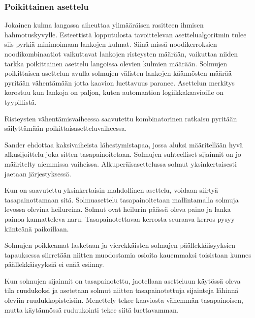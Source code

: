 \documentclass[finnish,12pt]{article}
\begin{document}
		\subsubsection{Poikittainen asettelu}

Jokainen kulma langassa aiheuttaa ylimääräisen rasitteen ihmisen hahmotuskyvylle. \cite{RefWorks:47}
Esteettistä lopputulosta tavoittelevan asettelualgoritmin tulee siis pyrkiä minimoimaan lankojen kulmat.
Siinä missä noodikerroksien noodikombinaatiot vaikuttavat lankojen risteysten määrään, vaikuttaa niiden tarkka poikittainen asettelu langoissa olevien kulmien määrään.
Solmujen poikittaisen asettelun avulla solmujen välisten lankojen käännösten määrää pyritään vähentämään jotta kaavion luettavuus paranee.
Asettelun merkitys korostuu kun lankoja on paljon, kuten automaation logiikkakaavioille on tyypillistä.

Risteysten vähentämisvaiheessa saavutettu kombinatorinen ratkaisu pyritään säilyttämään poikittaisasetteluvaiheessa.


\cite{RefWorks:49}

Sander ehdottaa kaksivaiheista lähestymistapaa, jossa aluksi määritellään hyvä alkusijoittelu joka sitten tasapainoitetaan.
Solmujen suhteelliset sijainnit on jo määritelty aiemmissa vaiheissa.
Alkuperäisasettelussa solmut yksinkertaisesti jaetaan järjestyksessä.

Kun on saavutettu yksinkertaisin mahdollinen asettelu, voidaan siirtyä tasapainottamaan sitä.
Solmuasettelu tasapainoitetaan mallintamalla solmuja levossa olevina heilureina.
Solmut ovat heilurin päässä oleva paino ja lanka painoa kannatteleva naru.
Tasapainotettavaa kerrosta seuraava kerros pysyy kiinteänä paikoillaan.

Solmujen poikkeamat lasketaan ja vierekkäisten solmujen päällekkäisyyksien tapauksessa siirretään niitten muodostamia osioita kauemmaksi toisistaan kunnes päällekkäisyyksiä ei enää esiinny.





Kun solmujen sijainnit on tasapainotettu, jaotellaan asetteluun käytössä oleva tila ruudukoksi ja asetetaan solmut niitten tasapainotettuja sijainteja lähinnä oleviin ruudukkopisteisiin.
Menettely tekee kaaviosta vähemmän tasapainoisen, mutta käytännössä ruduukointi tekee siitä luettavamman.
\end{document}

